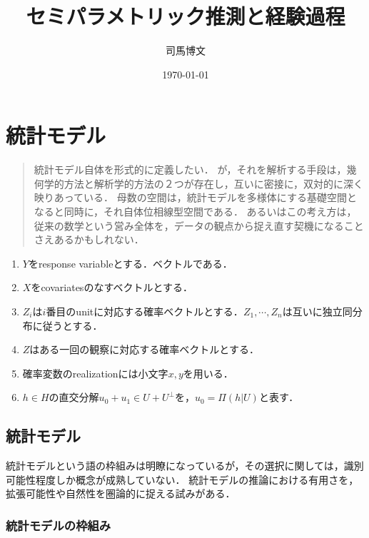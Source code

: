 \documentclass[uplatex,dvipdfmx]{jsreport}
\title{セミパラメトリック推測と経験過程}
\author{司馬博文}
\date{\today}
\begin{document}
\tableofcontents

\chapter{統計モデル}

\begin{quotation}
    統計モデル自体を形式的に定義したい．
    が，それを解析する手段は，幾何学的方法と解析学的方法の２つが存在し，互いに密接に，双対的に深く映りあっている．
    母数の空間は，統計モデルを多様体にする基礎空間となると同時に，それ自体位相線型空間である．
    あるいはこの考え方は，従来の数学という営み全体を，データの観点から捉え直す契機になることさえあるかもしれない．
\end{quotation}

\begin{notation}
    \begin{enumerate}
        \item $Y$をresponse variableとする．ベクトルである．
        \item $X$をcovariatesのなすベクトルとする．
        \item $Z_i$は$i$番目のunitに対応する確率ベクトルとする．$Z_1,\cdots,Z_n$は互いに独立同分布に従うとする．
        \item $Z$はある一回の観察に対応する確率ベクトルとする．
        \item 確率変数のrealizationには小文字$x,y$を用いる．
        \item $h\in H$の直交分解$u_0+u_1\in U+U^\perp$を，$u_0=\Pi(h|U)$と表す．
    \end{enumerate}
\end{notation}

\section{統計モデル}

\begin{tcolorbox}[colframe=ForestGreen, colback=ForestGreen!10!white,breakable,colbacktitle=ForestGreen!40!white,coltitle=black,fonttitle=\bfseries\sffamily,
title=]
    統計モデルという語の枠組みは明瞭になっているが，その選択に関しては，識別可能性程度しか概念が成熟していない．
    統計モデルの推論における有用さを，拡張可能性や自然性を圏論的に捉える試みがある．
\end{tcolorbox}

\subsection{統計モデルの枠組み}
\end{document}
